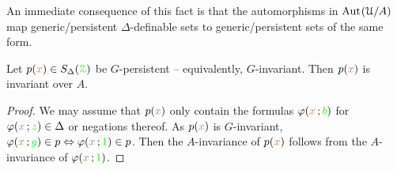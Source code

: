 An immediate consequence of this fact is that the automorphisms in ${\rm Aut\kern.15ex}(\EuScript U/A)$ map generic/persistent $\Delta$-definable sets to generic/persistent sets of the same form.



\begin{fact} 
  Let $p({\color{brown} x})\in S_\Delta({\color{green}\EuScript Z})$ be $G$-persistent -- equivalently, $G$-invariant.
  Then $p({\color{brown} x})$ is invariant over $A$.
\end{fact}

\begin{proof}
  We may assume that $p({\color{brown} x})$ only contain the formulas $\varphi({\color{brown} x}\,;{\color{green} b})$ for $\varphi({\color{brown} x}\,;{\color{green} z})\in\Delta$ or negations thereof.
  As $p({\color{brown} x})$ is $G$-invariant, $\varphi({\color{brown} x}\,;{\color{green} g})\in p\Leftrightarrow\varphi({\color{brown} x}\,;{\color{green} 1})\in p$.
  Then the $A$-invariance of $p({\color{brown} x})$ follows from the $A$-invariance of $\varphi({\color{brown} x}\,;{\color{green} 1})$.
\end{proof}





